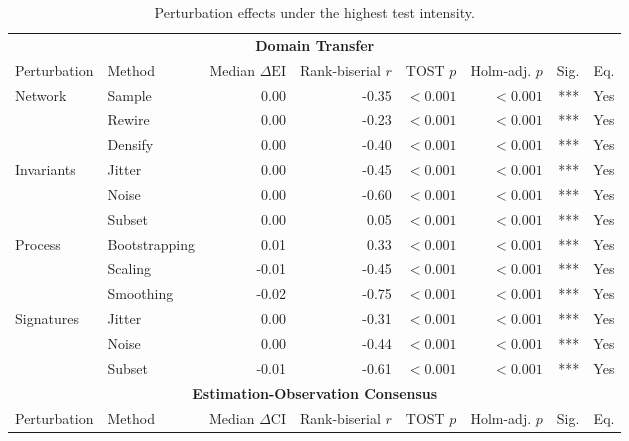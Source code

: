 \documentclass{article}
\begin{document}
\clearpage
\begin{table}[H]
\centering
\footnotesize
\captionsetup{position=top,skip=12pt}
\caption{Perturbation effects under the highest test intensity.}
\label{tab:si-perturb}
\setlength{\tabcolsep}{2pt}
\begin{tabularx}{\linewidth}{@{}l>{\raggedright\arraybackslash}Xrrrrrr@{}}
\toprule
\multicolumn{8}{c}{\textbf{Domain Transfer}} \\
\cmidrule(lr){1-8}
Perturbation & Method & \shortstack{Median\\$\Delta\mathrm{EI}$} & \shortstack{Rank-biserial\\$r$} & \shortstack{TOST\\$p$} & \shortstack{Holm-adj.\\$p$} & Sig. & Eq. \\
\midrule
Network & Sample & 0.00 & -0.35 & $<0.001$ & $<0.001$ & *** & Yes \\
 & Rewire & 0.00 & -0.23 & $<0.001$ & $<0.001$ & *** & Yes \\
 & Densify & 0.00 & -0.40 & $<0.001$ & $<0.001$ & *** & Yes \\
\addlinespace
Invariants & Jitter & 0.00 & -0.45 & $<0.001$ & $<0.001$ & *** & Yes \\
 & Noise & 0.00 & -0.60 & $<0.001$ & $<0.001$ & *** & Yes \\
 & Subset & 0.00 & 0.05 & $<0.001$ & $<0.001$ & *** & Yes \\
\addlinespace
Process & Bootstrapping & 0.01 & 0.33 & $<0.001$ & $<0.001$ & *** & Yes \\
 & Scaling & -0.01 & -0.45 & $<0.001$ & $<0.001$ & *** & Yes \\
 & Smoothing & -0.02 & -0.75 & $<0.001$ & $<0.001$ & *** & Yes \\
\addlinespace
Signatures & Jitter & 0.00 & -0.31 & $<0.001$ & $<0.001$ & *** & Yes \\
 & Noise & 0.00 & -0.44 & $<0.001$ & $<0.001$ & *** & Yes \\
 & Subset & -0.01 & -0.61 & $<0.001$ & $<0.001$ & *** & Yes \\
\midrule
\multicolumn{8}{c}{\textbf{Estimation-Observation Consensus}} \\
\cmidrule(lr){1-8}
Perturbation & Method & \shortstack{Median\\$\Delta\mathrm{CI}$} & \shortstack{Rank-biserial\\$r$} & \shortstack{TOST\\$p$} & \shortstack{Holm-adj.\\$p$} & Sig. & Eq. \\

\end{tabularx}
\end{table}
\end{document}

